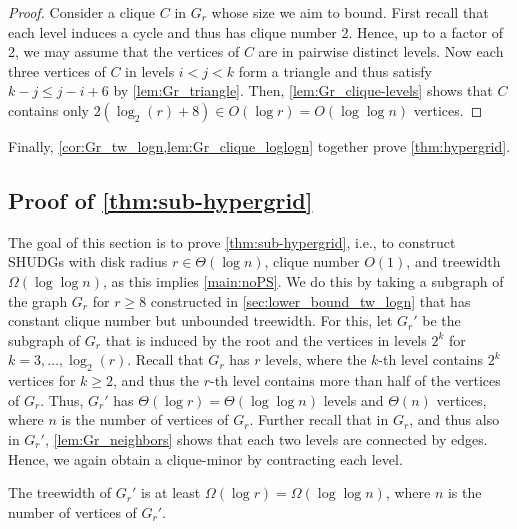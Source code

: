 \documentclass[a4paper,english,cleveref,thm-restate]{lipics-v2021}
\begin{document}
\begin{proof}
    Consider a clique $ C $ in $ G_r $ whose size we aim to bound.
    First recall that each level induces a cycle and thus has clique number 2.
    Hence, up to a factor of 2, we may assume that the vertices of $ C $ are in pairwise distinct levels.
    Now each three vertices of $ C $ in levels $ i < j < k $ form a triangle and thus satisfy $ k - j \leq j - i + 6 $ by \cref{lem:Gr_triangle}.
    Then, \cref{lem:Gr_clique-levels} shows that $ C $ contains only $ 2 (\log_2(r) + 8) \in O(\log r) = O(\log \log n) $ vertices. 
\end{proof}
%
Finally, \cref{cor:Gr_tw_logn,lem:Gr_clique_loglogn} together prove \cref{thm:hypergrid}.



\subsection{Proof of \texorpdfstring{\cref{thm:sub-hypergrid}}{Theorem 9}}
\label{sec:lower_bound_tw_loglogn}

The goal of this section is to prove \cref{thm:sub-hypergrid}, i.e., to construct SHUDGs with disk radius $ r \in \Theta(\log n) $, clique number $ O(1) $, and treewidth $ \Omega(\log \log n) $, as this implies \cref{main:noPS}.
We do this by taking a subgraph of the graph $ G_r $ for $ r \geq 8 $ constructed in \cref{sec:lower_bound_tw_logn} that has constant clique number but unbounded treewidth.
For this, let $ G_r' $ be the subgraph of $ G_r $ that is induced by the root and the vertices in levels $ 2^k $ for $ k = 3, \dots, \log_2(r) $.
Recall that $ G_r $ has $ r $ levels, where the $ k $-th level contains $ 2^k $ vertices for $ k \geq 2 $, and thus the $ r $-th level contains more than half of the vertices of $ G_r $.
Thus, $ G_r' $ has $ \Theta(\log r) = \Theta( \log \log n ) $ levels and $ \Theta(n) $ vertices, where $ n $ is the number of vertices of $ G_r $.
Further recall that in $ G_r $, and thus also in $ G_r' $, \cref{lem:Gr_neighbors} shows that each two levels are connected by edges.
Hence, we again obtain a clique-minor by contracting each level.

\begin{lemma}\label{lem:Gr'_tw_loglogn}
    The treewidth of $ G_r' $ is at least $ \Omega(\log r) = \Omega(\log \log n) $, where $ n $ is the number of vertices of $ G_r' $.
\end{lemma}
\end{document}
